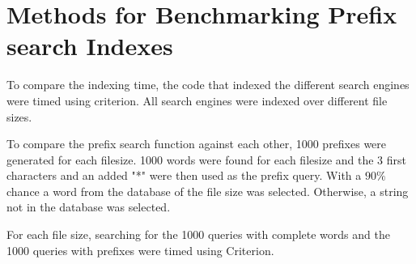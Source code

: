 \section{Methods for Benchmarking Prefix search Indexes}
To compare the indexing time, the code that indexed the different search engines were timed using criterion. All search engines were indexed over different file sizes.

To compare the prefix search function against each other, 1000 prefixes were generated for each filesize. 1000 words were found for each filesize and the 3 first characters and an added "*" were then used as the prefix query. With a $90\%$ chance a word from the database of the file size was selected. Otherwise, a string not in the database was selected. 

For each file size, searching for the 1000 queries with complete words and the 1000 queries with prefixes were timed using Criterion.


